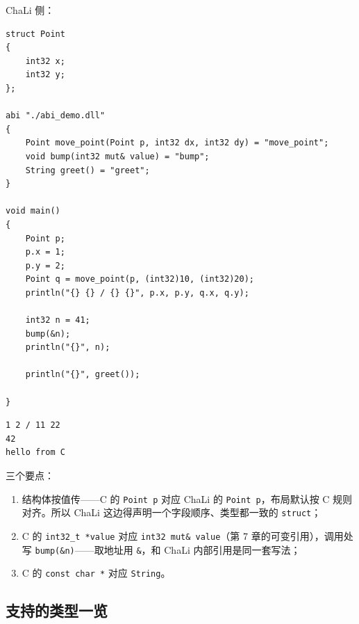 ChaLi 侧：

\par
\medskip
\begin{lstlisting}[style=chali]
struct Point
{
    int32 x;
    int32 y;
};

abi "./abi_demo.dll"
{
    Point move_point(Point p, int32 dx, int32 dy) = "move_point";
    void bump(int32 mut& value) = "bump";
    String greet() = "greet";
}

void main()
{
    Point p;
    p.x = 1;
    p.y = 2;
    Point q = move_point(p, (int32)10, (int32)20);
    println("{} {} / {} {}", p.x, p.y, q.x, q.y);

    int32 n = 41;
    bump(&n);
    println("{}", n);

    println("{}", greet());

}
\end{lstlisting}
\par
\medskip

\par
\medskip
\begin{lstlisting}[style=out]
1 2 / 11 22
42
hello from C
\end{lstlisting}
\par
\medskip

三个要点：

\begin{enumerate}

\item 结构体按值传——C 的 \texttt{Point p} 对应 ChaLi 的 \texttt{Point p}，布局默认按 C 规则对齐。所以 ChaLi 这边得声明一个字段顺序、类型都一致的 \texttt{struct}；

\item C 的 \texttt{int32\_t *value} 对应 \texttt{int32 mut\& value}（第 7 章的可变引用），调用处写 \texttt{bump(\allowbreak{}\&n)\allowbreak{}}——取地址用 \texttt{\&}，和 ChaLi 内部引用是同一套写法；

\item C 的 \texttt{const char *} 对应 \texttt{String}。

\end{enumerate}

\subsection*{支持的类型一览}

